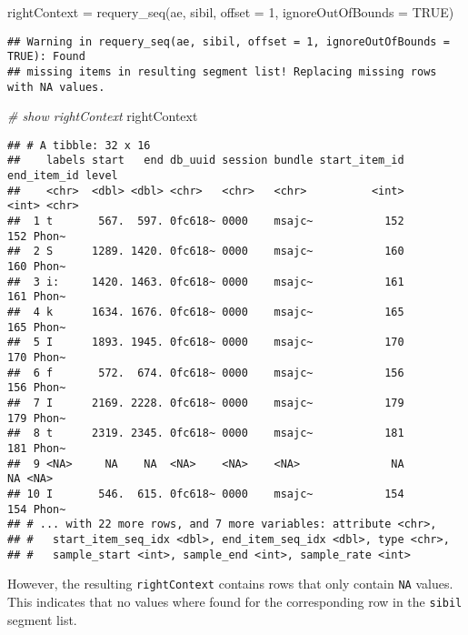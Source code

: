 \documentclass[
]{book}
\newenvironment{Shaded}{\begin{snugshade}}{\end{snugshade}}
\newcommand{\AttributeTok}[1]{\textcolor[rgb]{0.77,0.63,0.00}{#1}}
\newcommand{\CommentTok}[1]{\textcolor[rgb]{0.56,0.35,0.01}{\textit{#1}}}
\newcommand{\ConstantTok}[1]{\textcolor[rgb]{0.00,0.00,0.00}{#1}}
\newcommand{\DecValTok}[1]{\textcolor[rgb]{0.00,0.00,0.81}{#1}}
\newcommand{\FunctionTok}[1]{\textcolor[rgb]{0.00,0.00,0.00}{#1}}
\newcommand{\NormalTok}[1]{#1}
\newcommand{\OtherTok}[1]{\textcolor[rgb]{0.56,0.35,0.01}{#1}}
\begin{document}
\begin{Shaded}
\begin{Highlighting}[]
\NormalTok{rightContext }\OtherTok{=} \FunctionTok{requery\_seq}\NormalTok{(ae, sibil,}
                           \AttributeTok{offset =} \DecValTok{1}\NormalTok{,}
                           \AttributeTok{ignoreOutOfBounds =} \ConstantTok{TRUE}\NormalTok{)}
\end{Highlighting}
\end{Shaded}

\begin{verbatim}
## Warning in requery_seq(ae, sibil, offset = 1, ignoreOutOfBounds = TRUE): Found
## missing items in resulting segment list! Replacing missing rows with NA values.
\end{verbatim}

\begin{Shaded}
\begin{Highlighting}[]
\CommentTok{\# show rightContext}
\NormalTok{rightContext}
\end{Highlighting}
\end{Shaded}

\begin{verbatim}
## # A tibble: 32 x 16
##    labels start   end db_uuid session bundle start_item_id end_item_id level
##    <chr>  <dbl> <dbl> <chr>   <chr>   <chr>          <int>       <int> <chr>
##  1 t       567.  597. 0fc618~ 0000    msajc~           152         152 Phon~
##  2 S      1289. 1420. 0fc618~ 0000    msajc~           160         160 Phon~
##  3 i:     1420. 1463. 0fc618~ 0000    msajc~           161         161 Phon~
##  4 k      1634. 1676. 0fc618~ 0000    msajc~           165         165 Phon~
##  5 I      1893. 1945. 0fc618~ 0000    msajc~           170         170 Phon~
##  6 f       572.  674. 0fc618~ 0000    msajc~           156         156 Phon~
##  7 I      2169. 2228. 0fc618~ 0000    msajc~           179         179 Phon~
##  8 t      2319. 2345. 0fc618~ 0000    msajc~           181         181 Phon~
##  9 <NA>     NA    NA  <NA>    <NA>    <NA>              NA          NA <NA> 
## 10 I       546.  615. 0fc618~ 0000    msajc~           154         154 Phon~
## # ... with 22 more rows, and 7 more variables: attribute <chr>,
## #   start_item_seq_idx <dbl>, end_item_seq_idx <dbl>, type <chr>,
## #   sample_start <int>, sample_end <int>, sample_rate <int>
\end{verbatim}

However, the resulting \texttt{rightContext} contains rows that only contain \texttt{NA} values. This indicates that no values where found for the corresponding row in the \texttt{sibil} segment list.
\end{document}
